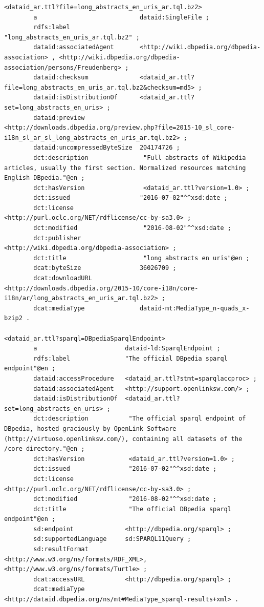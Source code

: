 \documentclass[a4paper,english,twoside,BCOR1.5cm,headsepline,DIV12,appendixprefix,final,12pt]{scrbook}
\begin{document}
\begin{lstlisting}[language=ttl, captionpos=b, label=lst:dcex,linewidth=\columnwidth,breaklines=true,basicstyle=\ttfamily\scriptsize]
<dataid_ar.ttl?file=long_abstracts_en_uris_ar.tql.bz2>
        a                            dataid:SingleFile ;
        rdfs:label                   "long_abstracts_en_uris_ar.tql.bz2" ;
        dataid:associatedAgent       <http://wiki.dbpedia.org/dbpedia-association> , <http://wiki.dbpedia.org/dbpedia-association/persons/Freudenberg> ;
        dataid:checksum              <dataid_ar.ttl?file=long_abstracts_en_uris_ar.tql.bz2&checksum=md5> ;
        dataid:isDistributionOf      <dataid_ar.ttl?set=long_abstracts_en_uris> ;
        dataid:preview               <http://downloads.dbpedia.org/preview.php?file=2015-10_sl_core-i18n_sl_ar_sl_long_abstracts_en_uris_ar.tql.bz2> ;
        dataid:uncompressedByteSize  204174726 ;
        dct:description               "Full abstracts of Wikipedia articles, usually the first section. Normalized resources matching English DBpedia."@en ;
        dct:hasVersion                <dataid_ar.ttl?version=1.0> ;
        dct:issued                   "2016-07-02"^^xsd:date ;
        dct:license                   <http://purl.oclc.org/NET/rdflicense/cc-by-sa3.0> ;
        dct:modified                  "2016-08-02"^^xsd:date ;
        dct:publisher                 <http://wiki.dbpedia.org/dbpedia-association> ;
        dct:title                     "long abstracts en uris"@en ;
        dcat:byteSize                36026709 ;
        dcat:downloadURL             <http://downloads.dbpedia.org/2015-10/core-i18n/core-i18n/ar/long_abstracts_en_uris_ar.tql.bz2> ;
        dcat:mediaType               dataid-mt:MediaType_n-quads_x-bzip2 .
        
<dataid_ar.ttl?sparql=DBpediaSparqlEndpoint>
        a                        dataid-ld:SparqlEndpoint ;
        rdfs:label               "The official DBpedia sparql endpoint"@en ;
        dataid:accessProcedure   <dataid_ar.ttl?stmt=sparqlaccproc> ;
        dataid:associatedAgent   <http://support.openlinksw.com/> ;
        dataid:isDistributionOf  <dataid_ar.ttl?set=long_abstracts_en_uris> ;
        dct:description           "The official sparql endpoint of DBpedia, hosted graciously by OpenLink Software (http://virtuoso.openlinksw.com/), containing all datasets of the /core directory."@en ;
        dct:hasVersion            <dataid_ar.ttl?version=1.0> ;
        dct:issued                "2016-07-02"^^xsd:date ;
        dct:license               <http://purl.oclc.org/NET/rdflicense/cc-by-sa3.0> ;
        dct:modified              "2016-08-02"^^xsd:date ;
        dct:title                 "The official DBpedia sparql endpoint"@en ;
        sd:endpoint				 <http://dbpedia.org/sparql> ;
        sd:supportedLanguage	 sd:SPARQL11Query ;
        sd:resultFormat			 <http://www.w3.org/ns/formats/RDF_XML>, <http://www.w3.org/ns/formats/Turtle> ;
        dcat:accessURL           <http://dbpedia.org/sparql> ;
        dcat:mediaType           <http://dataid.dbpedia.org/ns/mt#MediaType_sparql-results+xml> .
        

\end{lstlisting}
\end{document}
